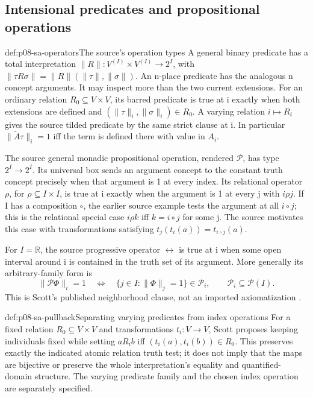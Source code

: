\subsection{Intensional predicates and propositional operations}

\begin{hbdefinition}{def:p08-sa-operators}{The source's operation types}
A general binary predicate has a total interpretation
\(\|R\|:V^{(I)}\times V^{(I)}\to2^I\), with
\(\|\tau R\sigma\|=\|R\|(\|\tau\|,\|\sigma\|)\).
An n-place predicate has the analogous n concept arguments.
It may inspect more than the two current extensions.
For an ordinary relation \(R_0\subseteq V\times V\), its barred
predicate is true at i exactly when both extensions are defined and
\((\|\tau\|_i,\|\sigma\|_i)\in R_0\).
A varying relation \(i\mapsto R_i\) gives the source tilded
predicate by the same strict clause at i. In particular
\(\|\widetilde A\tau\|_i=1\) iff the term is defined there
with value in \(A_i\).

The source general monadic propositional operation, rendered
\(\boxed{\mathscr P}\), has type \(2^I\to2^I\).
Its universal box sends an argument concept to the constant truth
concept precisely when that argument is 1 at every index. Its relational
operator \(\boxed\rho\), for \(\rho\subseteq I\times I\), is true
at i exactly when the argument is 1 at every j with \(i\rho j\).
If I has a composition \(\circ\), the earlier source example
tests the argument at all \(i\circ j\); this is the relational special case
\(i\rho k\) iff \(k=i\circ j\) for some j.
The source motivates this case with transformations satisfying
\(t_j(t_i(a))=t_{i\circ j}(a)\).

For \(I=\mathbb R\), the source progressive operator
\(\boxed{\leftrightarrow}\) is true at i when some open interval
around i is contained in the truth set of its argument. More generally
its arbitrary-family form is
\[
 \|\boxed{\mathscr P}\Phi\|_i=1
 \quad\Longleftrightarrow\quad
 \{j\in I:\|\Phi\|_j=1\}\in\mathscr P_i,
 \qquad \mathscr P_i\subseteq\mathcal P(I).
\]
This is Scott's published neighborhood clause, not an imported
axiomatization \cite[\S IV, pp.~155--161]{Scott1970}.
\end{hbdefinition}

\begin{hbexample}{def:p08-sa-pullback}{Separating varying predicates from index operations}
For a fixed relation \(R_0\subseteq V\times V\) and transformations
\(t_i:V\to V\), Scott proposes keeping individuals fixed while
setting \(aR_i b\) iff \((t_i(a),t_i(b))\in R_0\).
This preserves exactly the indicated atomic relation truth test;
it does not imply that the maps are bijective or preserve the whole
interpretation's equality and quantified-domain structure. The varying
predicate family and the chosen index operation are separately specified.
\end{hbexample}

